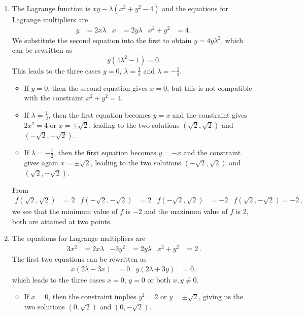 \begin{solution}
\begin{enumerate}
\item
The Lagrange function is $xy-\lambda(x^2+y^2-4)$ and
the equations for Lagrange multipliers are
\begin{align*}
y &= 2x \lambda &
x &= 2y\lambda &
x^2 + y^2 &= 4\,.
\end{align*}
We substitute the second equation into the first to obtain $y = 4y\lambda^2$,
which can be rewritten as
\[
y(4\lambda^2 - 1) = 0.
\]
This leads to the three cases $y=0$, $\lambda = \frac 12$ and $\lambda = - \frac 12$.

\begin{itemize}
\item
If $y=0$, then the second equation gives $x=0$, but this is not compatible with the constraint $x^2 + y^2 = 4$.

\item
If $\lambda = \frac 12$, then the first equation becomes $y=x$ and the constraint gives $2x^2 = 4$ or $x = \pm \sqrt{2}$, leading to the two solutions $(\sqrt{2}, \sqrt{2})$ and $(-\sqrt{2}, -\sqrt{2})$.

\item
If $\lambda = - \frac 12$, then the first equation becomes $y = -x$ and the constraint gives again $x = \pm \sqrt{2}$, leading to the two solutions $(-\sqrt{2}, \sqrt{2})$ and $(\sqrt{2}, -\sqrt{2})$.
\end{itemize}

From
\begin{align*}
f(\sqrt{2}, \sqrt{2}) &= 2 & f(-\sqrt{2}, -\sqrt{2}) &= 2 & f(-\sqrt{2}, \sqrt{2}) &= -2 & f(\sqrt{2}, -\sqrt{2}) = -2\,,
\end{align*}
we see that the minimum value of $f$ is $-2$ and the maximum value of $f$ is $2$, both are attained at two points.

\item
The equations for Lagrange multipliers are
\begin{align*}
3x^2 &= 2x \lambda &
-3y^2 &= 2y\lambda &
x^2 + y^2 &= 2 \,.
\end{align*}
The first two equations can be rewritten as
\begin{align*}
x(2\lambda-3x) &= 0 &
y(2\lambda+3y) &= 0\,.
\end{align*}
which leads to the three cases $x=0$, $y=0$ or both $x,y \neq 0$.

\begin{itemize}
\item
If $x=0$, then the constraint implies $y^2 = 2$ or $y = \pm \sqrt{2}$, giving us the two solutions $(0,\sqrt{2})$ and $(0,-\sqrt{2})$.


\end{itemize}
\end{enumerate}
\end{solution}

